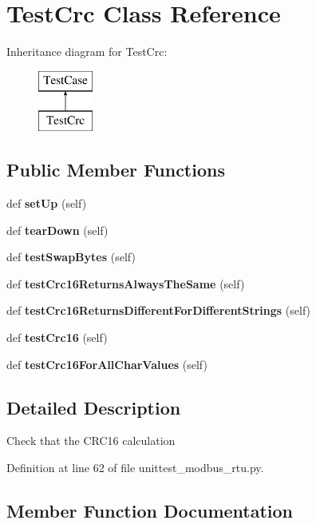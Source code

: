 \section{Test\+Crc Class Reference}
\label{classtests_1_1unittest__modbus__rtu_1_1_test_crc}
Inheritance diagram for Test\+Crc\+:\begin{figure}[H]
\begin{center}
\leavevmode
\includegraphics[height=2.000000cm]{classtests_1_1unittest__modbus__rtu_1_1_test_crc}
\end{center}
\end{figure}
\subsection*{Public Member Functions}
\begin{DoxyCompactItemize}
\item 
def {\bf set\+Up} (self)
\item 
def {\bf tear\+Down} (self)
\item 
def {\bf test\+Swap\+Bytes} (self)
\item 
def {\bf test\+Crc16\+Returns\+Always\+The\+Same} (self)
\item 
def {\bf test\+Crc16\+Returns\+Different\+For\+Different\+Strings} (self)
\item 
def {\bf test\+Crc16} (self)
\item 
def {\bf test\+Crc16\+For\+All\+Char\+Values} (self)
\end{DoxyCompactItemize}


\subsection{Detailed Description}
\begin{DoxyVerb}Check that the CRC16 calculation\end{DoxyVerb}
 

Definition at line 62 of file unittest\+\_\+modbus\+\_\+rtu.\+py.



\subsection{Member Function Documentation}
